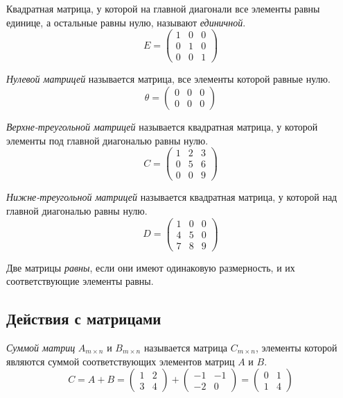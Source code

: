 \begin{definition}
  Квадратная матрица, у которой на главной диагонали все элементы равны единице, а остальные равны нулю, называют \textit{единичной}. \[
  E = \begin{pmatrix}
    1 & 0 & 0 \\
    0 & 1 & 0 \\
    0 & 0 & 1
  \end{pmatrix}
  \] 
\end{definition}

\begin{definition}
  \textit{Нулевой матрицей} называется матрица, все элементы которой равные нулю. \[
  \theta = \begin{pmatrix}
    0 & 0 & 0 \\
    0 & 0 & 0
  \end{pmatrix}
  \] 
\end{definition}

\begin{definition}
  \textit{Верхне-треугольной матрицей} называется квадратная матрица, у которой элементы под главной диагональю равны нулю. \[
  C = \begin{pmatrix}
    1 & 2 & 3 \\
    0 & 5 & 6 \\
    0 & 0 & 9
  \end{pmatrix}
  \] 
\end{definition}

\begin{definition}
  \textit{Нижне-треугольной матрицей} называется квадратная матрица, у которой над главной диагональю равны нулю. \[
  D = \begin{pmatrix}
    1 & 0 & 0 \\
    4 & 5 & 0 \\
    7 & 8 & 9
  \end{pmatrix}
  \] 
\end{definition}

Две матрицы \textit{равны}, если они имеют одинаковую размерность, и их соответствующие элементы равны. 

\subsection{Действия с матрицами}

\nobreakspace

\begin{definition}
  \textit{Суммой матриц} $A_{m \times n}$ и $B_{m \times n}$ называется матрица $C_{m \times n}$, элементы которой являются суммой соответствующих элементов матриц $A$ и $B$. \[
  C = A + B = \begin{pmatrix}
    1 & 2 \\
    3 & 4
  \end{pmatrix}
  +
  \begin{pmatrix}
    -1 & -1 \\
    -2 & 0
  \end{pmatrix}
  =
  \begin{pmatrix}
    0 & 1 \\
    1 & 4
  \end{pmatrix}
  \] 
\end{definition}

